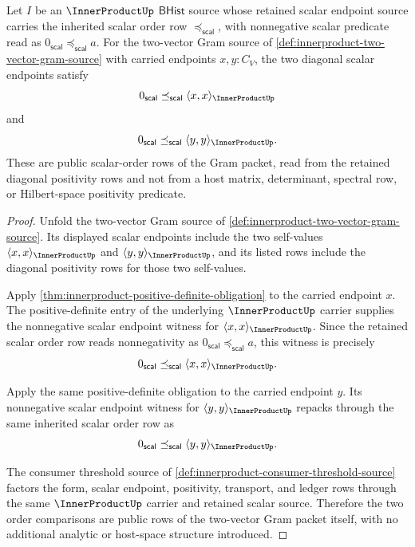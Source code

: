\begin{theorem}
\label{thm:innerproduct-gram-diagonal-scalar-nonnegativity}
Let $I$ be an $\InnerProductUp$ $\mathsf{BHist}$ source whose retained
scalar endpoint source carries the inherited scalar order row
$\preceq_{\mathsf{scal}}$, with nonnegative scalar predicate read as
$0_{\mathsf{scal}}\preceq_{\mathsf{scal}}a$. For the two-vector Gram source
of \autoref{def:innerproduct-two-vector-gram-source} with carried endpoints
$x,y:C_V$, the two diagonal scalar endpoints satisfy
$$
0_{\mathsf{scal}}\preceq_{\mathsf{scal}}
\langle x,x\rangle_{\InnerProductUp}
$$
and
$$
0_{\mathsf{scal}}\preceq_{\mathsf{scal}}
\langle y,y\rangle_{\InnerProductUp}.
$$
These are public scalar-order rows of the Gram packet, read from the retained
diagonal positivity rows and not from a host matrix, determinant, spectral row,
or Hilbert-space positivity predicate.
\end{theorem}
\begin{proof}
Unfold the two-vector Gram source of
\autoref{def:innerproduct-two-vector-gram-source}. Its displayed scalar
endpoints include the two self-values
$\langle x,x\rangle_{\InnerProductUp}$ and
$\langle y,y\rangle_{\InnerProductUp}$, and its listed rows include the
diagonal positivity rows for those two self-values.

Apply \autoref{thm:innerproduct-positive-definite-obligation} to the carried
endpoint $x$. The positive-definite entry of the underlying
$\InnerProductUp$ carrier supplies the nonnegative scalar endpoint witness for
$\langle x,x\rangle_{\InnerProductUp}$. Since the retained scalar order row
reads nonnegativity as $0_{\mathsf{scal}}\preceq_{\mathsf{scal}}a$, this
witness is precisely
$$
0_{\mathsf{scal}}\preceq_{\mathsf{scal}}
\langle x,x\rangle_{\InnerProductUp}.
$$

Apply the same positive-definite obligation to the carried endpoint $y$. Its
nonnegative scalar endpoint witness for
$\langle y,y\rangle_{\InnerProductUp}$ repacks through the same inherited
scalar order row as
$$
0_{\mathsf{scal}}\preceq_{\mathsf{scal}}
\langle y,y\rangle_{\InnerProductUp}.
$$

The consumer threshold source of
\autoref{def:innerproduct-consumer-threshold-source} factors the form,
scalar endpoint, positivity, transport, and ledger rows through the same
$\InnerProductUp$ carrier and retained scalar source. Therefore the two order
comparisons are public rows of the two-vector Gram packet itself, with no
additional analytic or host-space structure introduced.
\end{proof}
